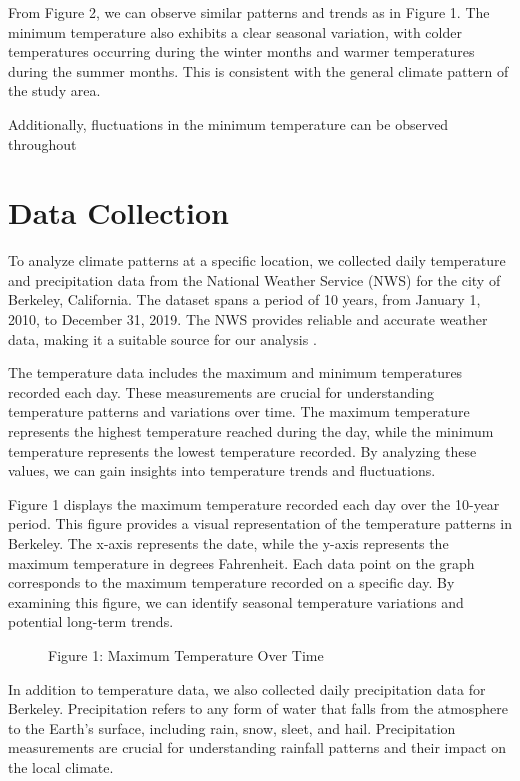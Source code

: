\documentclass{article}
\begin{document}
From Figure 2, we can observe similar patterns and trends as in Figure 1. The minimum temperature also exhibits a clear seasonal variation, with colder temperatures occurring during the winter months and warmer temperatures during the summer months. This is consistent with the general climate pattern of the study area.

Additionally, fluctuations in the minimum temperature can be observed throughout
\section{Data Collection}

To analyze climate patterns at a specific location, we collected daily temperature and precipitation data from the National Weather Service (NWS) for the city of Berkeley, California. The dataset spans a period of 10 years, from January 1, 2010, to December 31, 2019. The NWS provides reliable and accurate weather data, making it a suitable source for our analysis \cite{NWS}.

The temperature data includes the maximum and minimum temperatures recorded each day. These measurements are crucial for understanding temperature patterns and variations over time. The maximum temperature represents the highest temperature reached during the day, while the minimum temperature represents the lowest temperature recorded. By analyzing these values, we can gain insights into temperature trends and fluctuations.

Figure 1 displays the maximum temperature recorded each day over the 10-year period. This figure provides a visual representation of the temperature patterns in Berkeley. The x-axis represents the date, while the y-axis represents the maximum temperature in degrees Fahrenheit. Each data point on the graph corresponds to the maximum temperature recorded on a specific day. By examining this figure, we can identify seasonal temperature variations and potential long-term trends.

\begin{figure}[h]
  \centering
  \caption{Figure 1: Maximum Temperature Over Time}
  \label{fig:max_temp}
\end{figure}

In addition to temperature data, we also collected daily precipitation data for Berkeley. Precipitation refers to any form of water that falls from the atmosphere to the Earth's surface, including rain, snow, sleet, and hail. Precipitation measurements are crucial for understanding rainfall patterns and their impact on the local climate.
\end{document}
